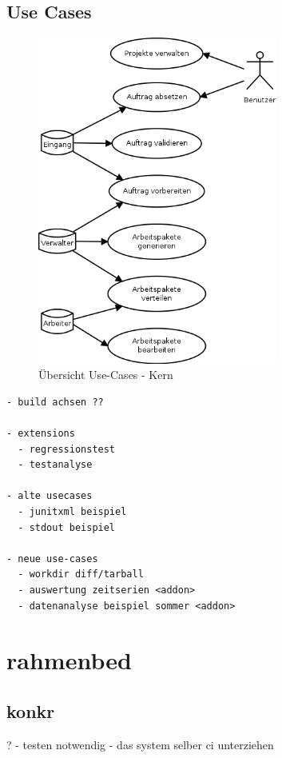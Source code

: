 \subsection{Use Cases}



\begin{figure}[ht]
  \centering
  \label{fig:use-case-muss}
  \includegraphics[width=0.7\textwidth]{imageinput/use-case-muss.png}
  \caption{\"Ubersicht Use-Cases - Kern}
\end{figure}


\begin{verbatim}
- build achsen ??

- extensions
  - regressionstest
  - testanalyse

- alte usecases
  - junitxml beispiel
  - stdout beispiel

- neue use-cases
  - workdir diff/tarball
  - auswertung zeitserien <addon>
  - datenanalyse beispiel sommer <addon>
\end{verbatim}


\section{rahmenbed}

\subsection{konkr}?
- testen notwendig
- das system selber ci unterziehen

